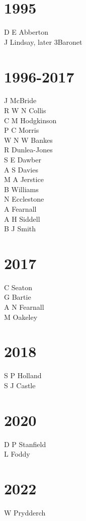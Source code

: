 \begin{multicols}{2}
  \section*{1995}
  D E Abberton \\
  J Lindsay, later 3\rd Baronet \\
  \section*{1996-2017}
  J McBride \\
  R W N Collis \\
  C M Hodgkinson \\
  P C Morris \\
  W N W Bankes \\
  R Dunlea-Jones \\
  S E Dawber \\
  A S Davies \\
  M A Jerstice \\
  B Williams \\
  N Ecclestone \\
  A Fearnall \\
  A H Siddell \\
  B J Smith \\
  \section*{2017}
  C Seaton \\
  G Bartie \\
  A N Fearnall \\
  M Oakeley \\
  \section*{2018}
  S P Holland \\
  S J Castle \\
  \section*{2020}
  D P Stanfield \\
  L Foddy \\
  \section*{2022}
  W Prydderch \\

\end{multicols}
